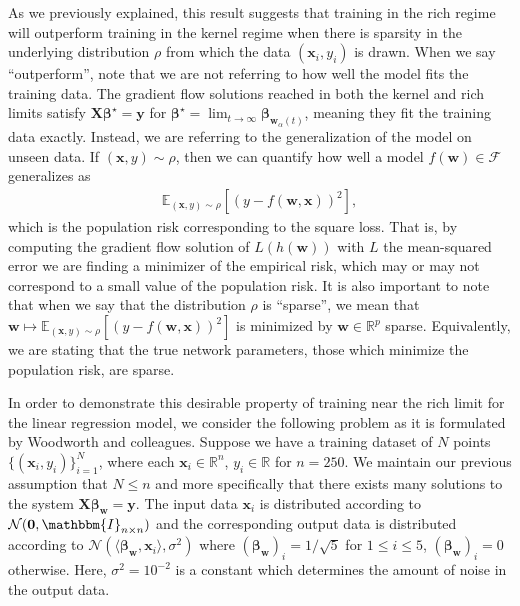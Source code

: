 \documentclass{article}
\begin{document}
As we previously explained, this result suggests that training in the rich regime will outperform training in the kernel regime when there is sparsity in the underlying distribution $\rho$ from which the data $(\boldsymbol{x}_i, y_i)$ is drawn. When we say \enquote{outperform}, note that we are not referring to how well the model fits the training data. The gradient flow solutions reached in both the kernel and rich limits satisfy $\boldsymbol{X}\boldsymbol{\beta}^{\star} = \boldsymbol{y}$ for $\boldsymbol{\beta}^{\star} = \lim_{t \to \infty} \boldsymbol{\beta}_{\boldsymbol{w}_{\alpha}(t)}$, meaning they fit the training data exactly. Instead, we are referring to the generalization of the model on unseen data. If $(\boldsymbol{x}, y) \sim \rho$, then we can quantify how well a model $f(\boldsymbol{w}) \in \mathcal{F}$ generalizes as
\begin{align}\label{poprisk}
\mathbb{E}_{(\boldsymbol{x}, y) \sim \rho}[(y - f(\boldsymbol{w}, \boldsymbol{x}))^2],
\end{align}
which is the population risk corresponding to the square loss. That is, by computing the gradient flow solution of $L(h(\boldsymbol{w}))$ with $L$ the mean-squared error we are finding a minimizer of the empirical risk, which may or may not correspond to a small value of the population risk. It is also important to note that when we say that the distribution $\rho$ is \enquote{sparse}, we mean that $\boldsymbol{w} \mapsto \mathbb{E}_{(\boldsymbol{x}, y) \sim \rho}[(y - f(\boldsymbol{w}, \boldsymbol{x}))^2]$ is minimized by $\boldsymbol{w} \in \mathbb{R}^p$ sparse. Equivalently, we are stating that the true network parameters, those which minimize the population risk, are sparse. 

In order to demonstrate this desirable property of training near the rich limit for the linear regression model, we consider the following problem as it is formulated by Woodworth and colleagues. Suppose we have a training dataset of $N$ points $\{(\boldsymbol{x}_i, y_i)\}_{i=1}^N$, where each $\boldsymbol{x}_i \in \mathbb{R}^n$, $y_i \in \mathbb{R}$ for $n = 250$. We maintain our previous assumption that $N \leq n$ and more specifically that there exists many solutions to the system $\boldsymbol{X}\boldsymbol{\beta}_{\boldsymbol{w}} = \boldsymbol{y}$. The input data $\boldsymbol{x}_i$ is distributed according to $\mathcal{N}(\boldsymbol{0},\mathbbm{I}_{n \times n})$ and the corresponding output data is distributed according to $\mathcal{N}(\langle \boldsymbol{\beta}_{\boldsymbol{w}}, \boldsymbol{x}_i \rangle, \sigma^2)$ where $(\boldsymbol{\beta}_{\boldsymbol{w}})_i = 1/\sqrt{5}$ for $1 \leq i \leq 5$, $(\boldsymbol{\beta}_{\boldsymbol{w}})_i = 0$ otherwise. Here, $\sigma^2 = 10^{-2}$ is a constant which determines the amount of noise in the output data.
\end{document}
